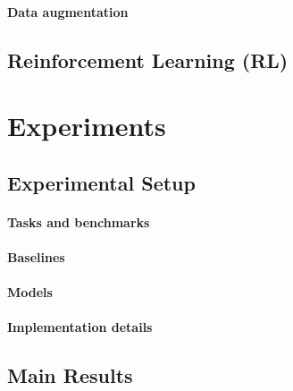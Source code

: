 \documentclass{article} %
\begin{document}
\paragraph{Data augmentation}

\subsection{Reinforcement Learning (RL)}


\section{Experiments}

\subsection{Experimental Setup}

\paragraph{Tasks and benchmarks}

\paragraph{Baselines}

\paragraph{Models}

\paragraph{Implementation details}

\subsection{Main Results}
\end{document}
